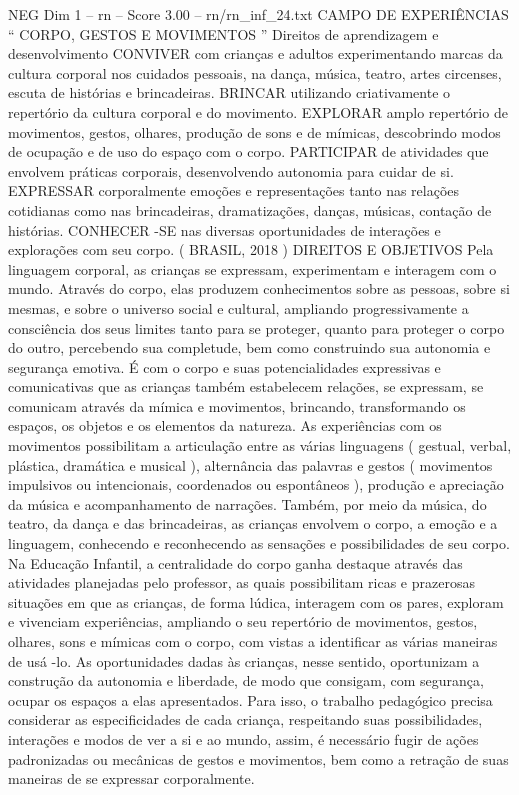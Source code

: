 \begin{textsample}{NEG Dim 1 – rn – Score 3.00 – rn/rn\_inf\_24.txt}  \label{ex:f1_neg_027}
CAMPO DE EXPERIÊNCIAS “ CORPO, GESTOS E MOVIMENTOS ” Direitos de aprendizagem e desenvolvimento CONVIVER com crianças e adultos experimentando marcas da cultura corporal nos cuidados pessoais, na dança, música, teatro, artes circenses, escuta de histórias e brincadeiras.
BRINCAR utilizando criativamente o repertório da cultura corporal e do movimento.
EXPLORAR amplo repertório de movimentos, gestos, olhares, produção de sons e de mímicas, descobrindo modos de ocupação e de uso do espaço com o corpo.
PARTICIPAR de atividades que envolvem práticas corporais, desenvolvendo autonomia para cuidar de si.
EXPRESSAR corporalmente emoções e representações tanto nas relações cotidianas como nas brincadeiras, dramatizações, danças, músicas, contação de histórias.
CONHECER -SE nas diversas oportunidades de interações e explorações com seu corpo. ( BRASIL, 2018 ) DIREITOS E OBJETIVOS Pela linguagem corporal, as crianças se expressam, experimentam e interagem com o mundo.
Através do corpo, elas produzem conhecimentos sobre as pessoas, sobre si mesmas, e sobre o universo social e cultural, ampliando progressivamente a consciência dos seus limites tanto para se proteger, quanto para proteger o corpo do outro, percebendo sua completude, bem como construindo sua autonomia e segurança emotiva.
É com o corpo e suas potencialidades expressivas e comunicativas que as crianças também estabelecem relações, se expressam, se comunicam através da mímica e movimentos, brincando, transformando os espaços, os objetos e os elementos da natureza.
As experiências com os movimentos possibilitam a articulação entre as várias linguagens ( gestual, verbal, plástica, dramática e musical ), alternância das palavras e gestos ( movimentos impulsivos ou intencionais, coordenados ou espontâneos ), produção e apreciação da música e acompanhamento de narrações.
Também, por meio da música, do teatro, da dança e das brincadeiras, as crianças envolvem o corpo, a emoção e a linguagem, conhecendo e reconhecendo as sensações e possibilidades de seu corpo.
Na Educação Infantil, a centralidade do corpo ganha destaque através das atividades planejadas pelo professor, as quais possibilitam ricas e prazerosas situações em que as crianças, de forma lúdica, interagem com os pares, exploram e vivenciam experiências, ampliando o seu repertório de movimentos, gestos, olhares, sons e mímicas com o corpo, com vistas a identificar as várias maneiras de usá -lo.
As oportunidades dadas às crianças, nesse sentido, oportunizam a construção da autonomia e liberdade, de modo que consigam, com segurança, ocupar os espaços a elas apresentados.
Para isso, o trabalho pedagógico precisa considerar as especificidades de cada criança, respeitando suas possibilidades, interações e modos de ver a si e ao mundo, assim, é necessário fugir de ações padronizadas ou mecânicas de gestos e movimentos, bem como a retração de suas maneiras de se expressar corporalmente.

\end{textsample}
